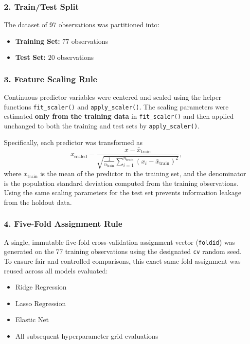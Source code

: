 \documentclass[
  11pt,
]{article}
\providecommand{\tightlist}{%
  \setlength{\itemsep}{0pt}\setlength{\parskip}{0pt}}
\begin{document}
\subsubsection{2. Train/Test Split}\label{traintest-split}

The dataset of 97 observations was partitioned into:

\begin{itemize}
\tightlist
\item
  \textbf{Training Set:} 77 observations
\item
  \textbf{Test Set:} 20 observations
\end{itemize}

\subsubsection{3. Feature Scaling Rule}\label{feature-scaling-rule}

Continuous predictor variables were centered and scaled using the helper
functions \texttt{fit\_scaler()} and \texttt{apply\_scaler()}. The
scaling parameters were estimated \textbf{only from the training data}
in \texttt{fit\_scaler()} and then applied unchanged to both the
training and test sets by \texttt{apply\_scaler()}.

Specifically, each predictor was transformed as \[x_{\text{scaled}} =
\frac{x - \bar{x}_{\text{train}}}
{\sqrt{\frac{1}{n_{\text{train}}} \sum_{i=1}^{n_{\text{train}}} (x_i - \bar{x}_{\text{train}})^2}},\]
where \(\bar{x}_{\text{train}}\) is the mean of the predictor in the
training set, and the denominator is the population standard deviation
computed from the training observations. Using the same scaling
parameters for the test set prevents information leakage from the
holdout data.

\subsubsection{4. Five-Fold Assignment
Rule}\label{five-fold-assignment-rule}

A single, immutable five-fold cross-validation assignment vector
(\texttt{foldid}) was generated on the 77 training observations using
the designated \texttt{cv} random seed. To ensure fair and controlled
comparisons, this exact same fold assignment was reused across all
models evaluated:

\begin{itemize}
\tightlist
\item
  Ridge Regression
\item
  Lasso Regression
\item
  Elastic Net
\item
  All subsequent hyperparameter grid evaluations
\end{itemize}
\end{document}
